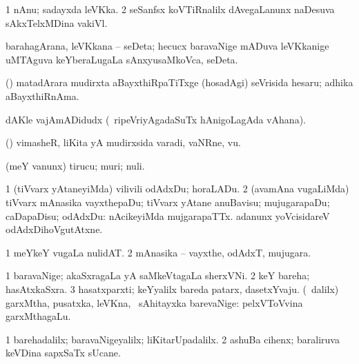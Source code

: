 {{{{{{\begin{center}
{{\noindent 
\gl{\pagu}
\expl{}
\bmng
\bnum
\num{1}  nAnu; sadayxda leVKka. 
\num{2}  seSanfsx koVTiRnalilx dAvegaLanunx naDesuva sAkxTelxMDina vakiVl. 
\enum
\emng
\eentry

\bentry 
{} 
\gl{\nA}
\expl{}
\bmng
barahagArana, leVKkana -- seDeta; hecucx baravaNige mADuva leVKkanige uMTAguva keYberaLugaLa sAnxyusaMkoVca, seDeta. 
\emng
\eentry

\bentry
{} 
\gl{\nA}
\expl{}
\bmng
(\ame) matadArara mudirxta aBayxthiRpaTiTxge (hosadAgi) seVrisida hesaru; adhika aBayxthiRnAma. 
\emng
\eentry

\bentry
{} 
\gl{\nA}
\expl{}
\bmng
dAKle vajAmADidudx (\kanmu\ ripeVriyAgadaSuTx hAnigoLagAda vAhana). 
\emng
\eentry

\bentry
{} 
\gl{\nA}
\expl{}
\bmng
(\AmA) vimasheR, liKita yA mudirxsida varadi, vaNRne, \mo vu. 
\emng
\eentry

\bentry
{} 
\gl{\sakirx}
\expl{}
\bmng
(meY \mo vanunx) tirucu; muri; nuli. 
\emng

\noindent
\gl{\akirx}
\expl{}
\bmng
\bnum
\num{1} (tiVvarx yAtaneyiMda) vilivili odAdxDu; horaLADu. 
\num{2} (avamAna \mo vugaLiMda) tiVvarx mAnasika vayxthepaDu; tiVvarx yAtane anuBavisu; mujugarapaDu; caDapaDisu; odAdxDu:  nAcikeyiMda mujgarapaTTx.  adanunx yoVcisidareV odAdxDihoVgutAtxne. 
\enum
\emng
\eentry

\bentry
{} 
\gl{\nA}
\expl{}
\bmng
\bnum
\num{1} meYkeY \mo vugaLa nulidAT. 
\num{2} mAnasika -- vayxthe, odAdxT, mujugara. 
\enum
\emng
\eentry

\bentry
{} 
\gl{\nA}
\expl{}
\bmng
\bnum
\num{1} baravaNige; akaSxragaLa yA saMkeVtagaLa sherxVNi. 
\num{2} keY bareha; hasAtxkaSxra. 
\num{3} hasatxparxti; keYyalilx bareda patarx, dasetxYvaju. 
 (\sA\ \bava dalilx) 
\banum
{} garxMtha, pusatxka, leVKna, \mo\ sAhitayxka barevaNige:  pelxVToVvina garxMthagaLu. 
  
\eanum
\numie
\enum
\emng

\noindent
\gl{\pagu}
\expl{}
\bmng
\bnum
\num{1}  barehadalilx; baravaNigeyalilx; liKitarUpadalilx. 
\hypertarget{writing pagu(2)}{} 
\num{2}  ashuBa cihenx; baraliruva keVDina sapxSaTx sUcane. 
\enum
\emng
\eentry

}}
\end{center}}}}}}}

